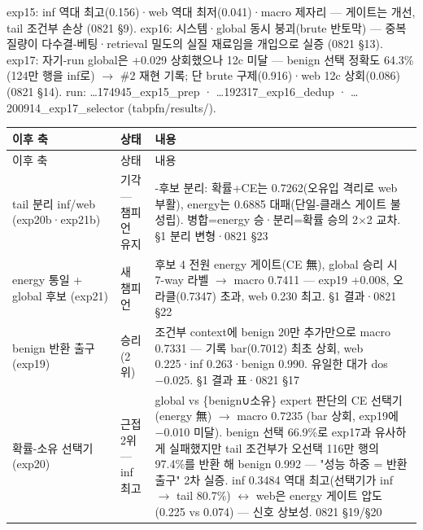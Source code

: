 exp15: inf 역대 최고(0.156)·web 역대 최저(0.041)·macro 제자리 — 게이트는 개선, tail 조건부 손상 (0821 §9). exp16: 시스템·global 동시 붕괴(brute 반토막) — 중복 질량이 다수결-베팅·retrieval 밀도의 실질 재료임을 개입으로 실증 (0821 §13). exp17: 자기-run global은 +\allowbreak{}0.029 상회했으나 12c 미달 — benign 선택 정확도 64.3\% (124만 행을 inf로)  \ensuremath{\rightarrow}  \#2 재현 기록; 단 brute 구제(0.916)·web 12c 상회(0.086) (0821 §14). run: …174945\_\allowbreak{}exp15\_\allowbreak{}prep · …192317\_\allowbreak{}exp16\_\allowbreak{}dedup · …200914\_\allowbreak{}exp17\_\allowbreak{}selector (tabpfn/\allowbreak{}results/\allowbreak{}).

\begingroup
\footnotesize
\begin{longtable}{>{\raggedright\arraybackslash}p{}>{\raggedright\arraybackslash}p{}>{\raggedright\arraybackslash}p{}}
\toprule
이후 축 & 상태 & 내용 \\ \midrule
\endfirsthead
이후 축 & 상태 & 내용 \\ \midrule
\endhead
{}tail 분리 inf/\allowbreak{}web (exp20b·exp21b) & 기각 — 챔피언 유지 & 5-후보 분리: 확률+\allowbreak{}CE는 0.7262(오유입 격리로 web 부활), energy는 0.6885 대패(단일-클래스 게이트 불성립). 병합=\allowbreak{}energy 승·분리=\allowbreak{}확률 승의 2×2 교차. §1 분리 변형·0821 §23 \\
{}energy 통일 +\allowbreak{} global 후보 (exp21) & 새 챔피언 & 후보 4 전원 energy 게이트(CE 無), global 승리 시 7-way 라벨  \ensuremath{\rightarrow}  macro 0.7411 — exp19 +\allowbreak{}0.008, 오라클(0.7347) 초과, web 0.230 최고. §1 결과·0821 §22 \\
{}benign 반환 출구 (exp19) & 승리 (2위) & 조건부 context에 benign 20만 추가만으로 macro 0.7331 — 기록 bar(0.7012) 최초 상회, web 0.225·inf 0.263·benign 0.990. 유일한 대가 dos −0.025. §1 결과 표·0821 §17 \\
{}확률-소유 선택기 (exp20) & 근접 2위 — inf 최고 & global vs \{benign∪소유\} expert 판단의 CE 선택기(energy 無)  \ensuremath{\rightarrow}  macro 0.7235 (bar 상회, exp19에 −0.010 미달). benign 선택 66.9\%로 exp17과 유사하게 실패했지만 tail 조건부가 오선택 116만 행의 97.4\%를 반환 해 benign 0.992 — "성능 하중 =\allowbreak{} 반환 출구" 2차 실증. inf 0.3484 역대 최고(선택기가 inf \ensuremath{\rightarrow} tail 80.7\%)  \ensuremath{\leftrightarrow}  web은 energy 게이트 압도(0.225 vs 0.074) — 신호 상보성. 0821 §19/\allowbreak{}§20 \\

\end{longtable}
